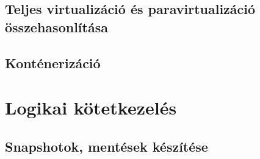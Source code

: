 \subsection{Teljes virtualizáció és paravirtualizáció összehasonlítása}
\subsection{Konténerizáció}

\section{Logikai kötetkezelés}
\subsection{Snapshotok, mentések készítése}


